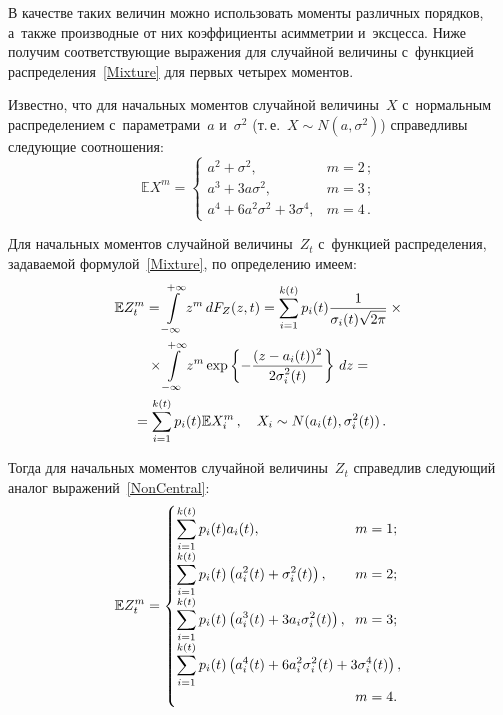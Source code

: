 \begin{multicols}{2}
В качестве таких величин можно использовать моменты различных порядков, 
а~также производные от них коэффициенты асимметрии и~эксцесса. Ниже получим 
соответствующие выражения для случайной величины с~функцией распределения~\eqref{Mixture} 
для первых четырех моментов.

Известно, что для начальных моментов случайной величины~$X$ с~нормальным распределением 
с~параметрами~$a$ и~$\sigma^2$ (т.\,е.\ $X\sim N(a,\sigma^2)$) справедливы 
следующие соотношения:
\begin{equation}
\mathbb{E} X^m=\begin{cases}
a^2+\sigma^2, & m=2\,;\\
a^3+3a\sigma^2, & m=3\,;\\
a^4+6a^2\sigma^2+3\sigma^4, & m=4\,.
\end{cases}\label{NonCentral}
\end{equation}

Для начальных моментов случайной величины~$Z_t$ с~функцией распределения, 
задаваемой формулой~\eqref{Mixture}, по определению имеем:
\begin{multline*}
\mathbb{E} Z_t^m=\int\limits_{-\infty}^{+\infty} z^m\,dF_Z(z,t)=
\sum\limits_{i=1}^{k(t)} p_i(t)\displaystyle\frac{\displaystyle 1\mathstrut}{\displaystyle \sigma_i(t)\sqrt{2\pi}\mathstrut}\times{}\\
{}\times 
\int\limits_{-\infty}^{+\infty} z^m\exp\left\{-\displaystyle\frac{\displaystyle (z-a_i(t))^2\mathstrut}{\displaystyle 2\sigma_i^2(t)\mathstrut}\right\} \,dz={}\\
{}=\sum\limits_{i=1}^{k(t)} p_i(t)\mathbb{E} X_i^m\,, \quad 
X_i\sim N(a_i(t),\sigma_i^2(t))\,.
\end{multline*}

Тогда для начальных моментов случайной величины~$Z_t$ справедлив следующий 
аналог выражений~\eqref{NonCentral}:
\begin{equation}
\mathbb{E} Z_t^m=\begin{cases}
\displaystyle\sum\limits_{i=1}^{k(t)} p_i(t) a_i(t), &\hspace*{-15mm} m=1;\\
\displaystyle\sum\limits_{i=1}^{k(t)} p_i(t)\left(a_i^2(t)+\sigma_i^2(t)\right), &\hspace*{-15mm} m=2;\\
\displaystyle\sum\limits_{i=1}^{k(t)} p_i(t)\left(a_i^3(t)+3a_i\sigma_i^2(t)\right), &\hspace*{-15mm} m=3;\\
\displaystyle\sum\limits_{i=1}^{k(t)} p_i(t)\left(a_i^4(t)+6a_i^2\sigma_i^2(t)+3\sigma_i^4(t)
\right), &\\ 
& \hspace*{-15mm}m=4.
\end{cases}\!\!\! \!\!\label{NonCentralZ}
\end{equation}


\end{multicols}

